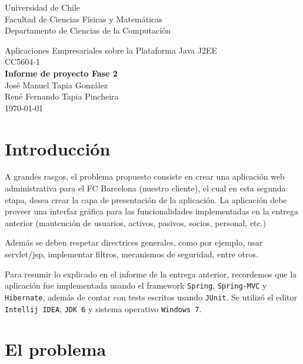 \documentclass[letter]{article}
\begin{document}

\thispagestyle{empty}
\begin{flushleft}
  Universidad de Chile\\Facultad de Ciencias Físicas y Matemáticas\\Departamento de Ciencias de la Computación\\[4cm]
\end{flushleft}
\begin{center}
  \huge{Aplicaciones Empresariales sobre la Plataforma Java J2EE\\[1.5cm] CC5604-1\\[0.4cm]}
  \Large{\textbf{Informe de proyecto Fase 2\\[2.5cm]}José Manuel Tapia González\\[0.4cm]René Fernando Tapia Pincheira\\[2.5cm] \today}
\end{center}


\newpage
\tableofcontents


\newpage
\section{Introducción}

A grandes rasgos, el problema propuesto consiste en crear una aplicación web administrativa para el FC Barcelona (nuestro cliente), el cual en esta segunda etapa, desea crear la capa de presentación de la aplicación. La aplicación debe proveer una interfaz gráfica para las funcionalidades implementadas en la entrega anterior (mantención de usuarios, activos, pasivos, socios, personal, etc.)

Además se deben respetar directrices generales, como por ejemplo, usar servlet/jsp, implementar filtros, mecanismos de seguridad, entre otros.

Para resumir lo explicado en el informe de la entrega anterior, recordemos que la aplicación fue implementada usando el framework \texttt{Spring}, \texttt{Spring-MVC} y \texttt{Hibernate}, además de contar con tests escritos usando \texttt{JUnit}. Se utilizó el editor \texttt{Intellij IDEA}, \texttt{JDK 6} y sistema operativo \texttt{Windows 7}.

\newpage
\section{El problema}
\end{document}
